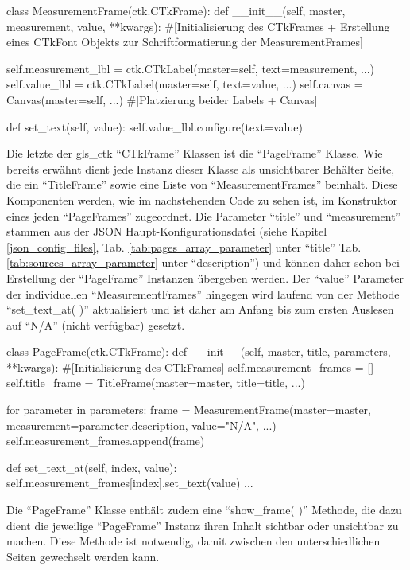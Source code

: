 \begin{pythoncode}
class MeasurementFrame(ctk.CTkFrame):
	def __init__(self, master, measurement, value, **kwargs):
		#[Initialisierung des CTkFrames + Erstellung eines CTkFont Objekts zur Schriftformatierung der MeasurementFrames]
		
		self.measurement_lbl = ctk.CTkLabel(master=self, text=measurement, ...)
		self.value_lbl = ctk.CTkLabel(master=self, text=value, ...)
		self.canvas = Canvas(master=self, ...)
		#[Platzierung beider Labels + Canvas]
		
	def set_text(self, value):
		self.value_lbl.configure(text=value)
\end{pythoncode}

Die letzte der \gls{gls_ctk} \enquote{CTkFrame} Klassen ist die \enquote{PageFrame} Klasse. Wie bereits erwähnt dient jede Instanz dieser Klasse als unsichtbarer Behälter \bzw Seite, die ein \enquote{TitleFrame} sowie eine Liste von \enquote{MeasurementFrames} beinhält. Diese Komponenten werden, wie im nachstehenden Code zu sehen ist, im Konstruktor eines jeden \enquote{PageFrames} zugeordnet. Die Parameter \enquote{title} und \enquote{measurement} stammen aus der JSON Haupt-Konfigurationsdatei (siehe Kapitel \ref{json_config_files}, Tab. \ref{tab:pages_array_parameter} unter \enquote{title} \bzw Tab. \ref{tab:sources_array_parameter}  unter \enquote{description}) und können daher schon bei Erstellung der \enquote{PageFrame} Instanzen übergeben werden. Der \enquote{value} Parameter der individuellen \enquote{MeasurementFrames} hingegen wird laufend von der Methode \enquote{set\_text\_at( )} aktualisiert und ist daher am Anfang bis zum ersten Auslesen auf \enquote{N/A} (\dt nicht verfügbar) gesetzt.
	
\begin{pythoncode}
class PageFrame(ctk.CTkFrame):
	def __init__(self, master, title, parameters, **kwargs):
		#[Initialisierung des CTkFrames]
		self.measurement_frames = []
		self.title_frame = TitleFrame(master=master, title=title, ...)
		
		for parameter in parameters:
			frame = MeasurementFrame(master=master, measurement=parameter.description, value="N/A", ...)
			self.measurement_frames.append(frame)

    def set_text_at(self, index, value):
        self.measurement_frames[index].set_text(value)
...
\end{pythoncode}

Die \enquote{PageFrame} Klasse enthält zudem eine \enquote{show\_frame( )} Methode, die dazu dient die jeweilige \enquote{PageFrame} Instanz \bzw ihren Inhalt sichtbar oder unsichtbar zu machen. Diese Methode ist notwendig, damit zwischen den unterschiedlichen Seiten gewechselt werden kann.

